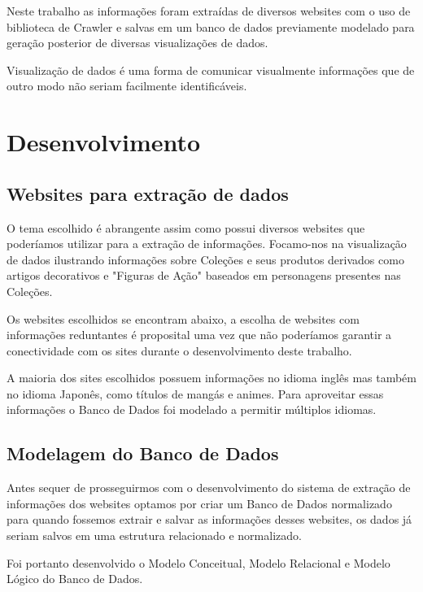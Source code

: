 \documentclass[12pt]{article}
\begin{document}
Neste trabalho as informações foram extraídas de diversos websites com o uso de biblioteca de Crawler e salvas em um banco de dados previamente modelado para geração posterior de diversas visualizações de dados. 

Visualização de dados é uma forma de comunicar visualmente informações que de outro modo não seriam facilmente identificáveis.


\section{Desenvolvimento}

\subsection{Websites para extração de dados}

O tema escolhido é abrangente assim como possui diversos websites que poderíamos utilizar para a extração de informações. Focamo-nos na visualização de dados ilustrando informações sobre Coleções e seus produtos derivados como artigos decorativos e "Figuras de Ação" baseados em personagens presentes nas Coleções. 

Os websites escolhidos se encontram abaixo, a escolha de websites com informações reduntantes é proposital uma vez que não poderíamos garantir a conectividade com os sites durante o desenvolvimento deste trabalho. 

\begin{enumerate}

\end{enumerate}

A maioria dos sites escolhidos possuem informações no idioma inglês mas também no idioma Japonês, como títulos de mangás e animes. Para aproveitar essas informações o Banco de Dados foi modelado a permitir múltiplos idiomas. 

\subsection{Modelagem do Banco de Dados}

Antes sequer de prosseguirmos com o desenvolvimento do sistema de extração de informações dos websites optamos por criar um Banco de Dados normalizado para quando fossemos extrair e salvar as informações desses websites, os dados já seriam salvos em uma estrutura relacionado e normalizado.

Foi portanto desenvolvido o Modelo Conceitual, Modelo Relacional e Modelo Lógico do Banco de Dados.
\end{document}
